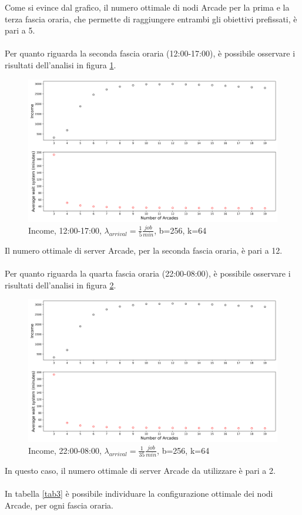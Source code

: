 \documentclass{article}
\begin{document}
Come si evince dal grafico, il numero ottimale di nodi Arcade per la prima e la terza fascia oraria, che permette di raggiungere entrambi gli obiettivi prefissati, è pari a 5.
\\ \\
Per quanto riguarda la seconda fascia oraria (12:00-17:00), è possibile osservare i risultati dell'analisi in figura \ref{figura:avg_wait_sys_aft}.
\begin{figure}[H]
	\centering
	\captionsetup{justification=centering,margin=2cm}
	\includegraphics[scale=0.48]{images/avg_wait_sys_aft.png}
	\caption{Income, 12:00-17:00, $\lambda_{arrival}=\frac{1}{5} \frac{job}{min}$, b=256, k=64}\label{figura:avg_wait_sys_aft}
\end{figure}
Il numero ottimale di server Arcade, per la seconda fascia oraria, è pari a 12.
\\ \\
Per quanto riguarda la quarta fascia oraria (22:00-08:00), è possibile osservare i risultati dell'analisi in figura \ref{figura:avg_wait_sys_night}.
\begin{figure}[H]
	\centering
	\captionsetup{justification=centering,margin=2cm}
	\includegraphics[scale=0.48]{images/avg_wait_sys_night.png}
	\caption{Income, 22:00-08:00, $\lambda_{arrival}=\frac{1}{35} \frac{job}{min}$, b=256, k=64}\label{figura:avg_wait_sys_night}
\end{figure}
In questo caso, il numero ottimale di server Arcade da utilizzare è pari a 2.
\\ \\
In tabella \ref{tab3} è possibile individuare la configurazione ottimale dei nodi Arcade, per ogni fascia oraria.
\end{document}
